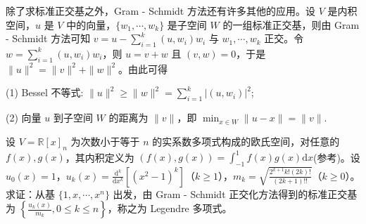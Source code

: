 \documentclass[../../main.tex]{subfiles}
\begin{document}
除了求标准正交基之外，Gram - Schmidt 方法还有许多其他的应用。设 $V$ 是内积空间，$u$ 是 $V$ 中的向量，$\{w_1,\cdots,w_k\}$ 是子空间 $W$ 的一组标准正交基，则由 Gram - Schmidt 方法可知 $v = u - \sum_{i = 1}^{k}(u,w_i)w_i$ 与 $w_1,\cdots,w_k$ 正交。令 $w = \sum_{i = 1}^{k}(u,w_i)w_i$，则 $u = v + w$ 且 $(v,w) = 0$，于是 $\|u\|^2 = \|v\|^2 + \|w\|^2$。由此可得

(1) Bessel 不等式: $\|u\|^2\geqslant \|w\|^2 = \sum_{i = 1}^{k}|(u,w_i)|^2$;

(2) 向量 $u$ 到子空间 $W$ 的距离为 $\|v\|$，即 $\min_{x\in W}\|u - x\| = \|v\|$. 

\begin{example}\label{example:例9.11}
设 $V = \mathbb{R}[x]_n$ 为次数小于等于 $n$ 的实系数多项式构成的欧氏空间，对任意的 $f(x),g(x)$，其内积定义为 $(f(x),g(x)) = \int_{-1}^{1}f(x)g(x)\mathrm{d}x$(参考)。设 $u_0(x)=1$，$u_k(x)=\frac{\mathrm{d}^k}{\mathrm{d}x^k}[(x^2 - 1)^k]$（$k\geqslant 1$），$m_k = \sqrt{\frac{2^{k + 1}k!(2k)!}{(2k + 1)!!}}$（$k\geqslant 0$）。求证：从基 $\{1,x,\cdots,x^n\}$ 出发，由 Gram - Schmidt 正交化方法得到的标准正交基为 $\left\{\frac{u_k(x)}{m_k},0\leqslant  k\leqslant  n\right\}$，称之为 Legendre 多项式。
\end{example}
\end{document}
